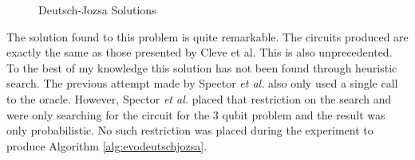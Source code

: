 \begin{figure}
\centering
{}
\caption{Deutsch-Jozsa Solutions}
\end{figure}

The solution found to this problem is quite remarkable.
The circuits produced are exactly the same as those presented by Cleve et al\cite{Cleve98quantumalgorithms}.
This is also unprecedented.
To the best of my knowledge this solution has not been found through heuristic search.
The previous attempt made by Spector \emph{et al.}\cite{LSpectorGPforQC,LSpectorANDOR,Spector:1999:QCA:316573.317112} also only used a single call to the oracle.
However, Spector \emph{et al.} placed that restriction on the search and were only searching for the circuit for the 3 qubit problem and the result was only probabilistic.
No such restriction was placed during the experiment to produce Algorithm \ref{alg:evodeutschjozsa}.


